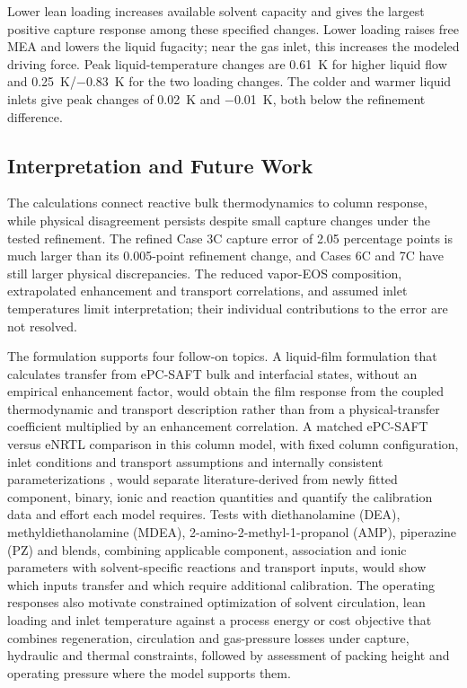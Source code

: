 Lower lean loading increases available solvent capacity and gives the largest positive capture response among these specified changes.
Lower loading raises free MEA and lowers the liquid \COtwo{} fugacity; near the gas inlet, this increases the modeled driving force.
Peak liquid-temperature changes are \qty{+0.61}{K} for higher liquid flow and \qty{+0.25}{K}/\qty{-0.83}{K} for the two loading changes.
The colder and warmer liquid inlets give peak changes of \qty{+0.02}{K} and \qty{-0.01}{K}, both below the refinement difference.

\FloatBarrier

\subsection{Interpretation and Future Work}
The calculations connect reactive bulk thermodynamics to column response, while physical disagreement persists despite small capture changes under the tested refinement.
The refined Case 3C capture error of \num{2.05} percentage points is much larger than its \num{0.005}-point refinement change, and Cases 6C and 7C have still larger physical discrepancies.
The reduced vapor-EOS composition, extrapolated enhancement and transport correlations, and assumed inlet temperatures limit interpretation; their individual contributions to the error are not resolved.

The formulation supports four follow-on topics.
A liquid-film formulation that calculates transfer from ePC-SAFT bulk and interfacial states, without an empirical enhancement factor, would obtain the film response from the coupled thermodynamic and transport description rather than from a physical-transfer coefficient multiplied by an enhancement correlation.
A matched ePC-SAFT versus eNRTL comparison in this column model, with fixed column configuration, inlet conditions and transport assumptions and internally consistent parameterizations \cite{Akula2023a,Zhang2011}, would separate literature-derived from newly fitted component, binary, ionic and reaction quantities and quantify the calibration data and effort each model requires.
Tests with diethanolamine (DEA), methyldiethanolamine (MDEA), 2-amino-2-methyl-1-propanol (AMP), piperazine (PZ) and blends, combining applicable component, association and ionic parameters with solvent-specific reactions and transport inputs, would show which inputs transfer and which require additional calibration.
The operating responses also motivate constrained optimization of solvent circulation, lean loading and inlet temperature against a process energy or cost objective that combines regeneration, circulation and gas-pressure losses under capture, hydraulic and thermal constraints, followed by assessment of packing height and operating pressure where the model supports them.
